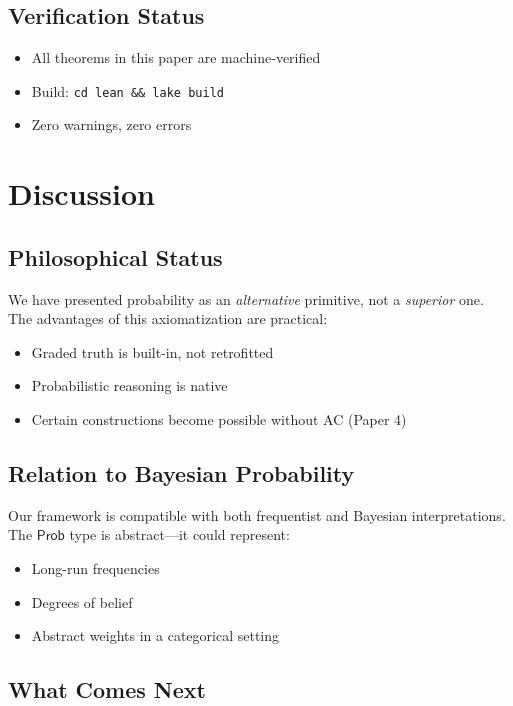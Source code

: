 \documentclass[11pt,a4paper]{article}
\newcommand{\Prob}{\mathsf{Prob}}
\begin{document}
\subsection{Verification Status}

\begin{itemize}
    \item All theorems in this paper are machine-verified
    \item Build: \texttt{cd lean \&\& lake build}
    \item Zero warnings, zero errors
\end{itemize}

\section{Discussion}

\subsection{Philosophical Status}

We have presented probability as an \emph{alternative} primitive, not a \emph{superior} one. The advantages of this axiomatization are practical:

\begin{itemize}
    \item Graded truth is built-in, not retrofitted
    \item Probabilistic reasoning is native
    \item Certain constructions become possible without AC (Paper 4)
\end{itemize}

\subsection{Relation to Bayesian Probability}

Our framework is compatible with both frequentist and Bayesian interpretations. The $\Prob$ type is abstract---it could represent:
\begin{itemize}
    \item Long-run frequencies
    \item Degrees of belief
    \item Abstract weights in a categorical setting
\end{itemize}

\subsection{What Comes Next}
\end{document}
